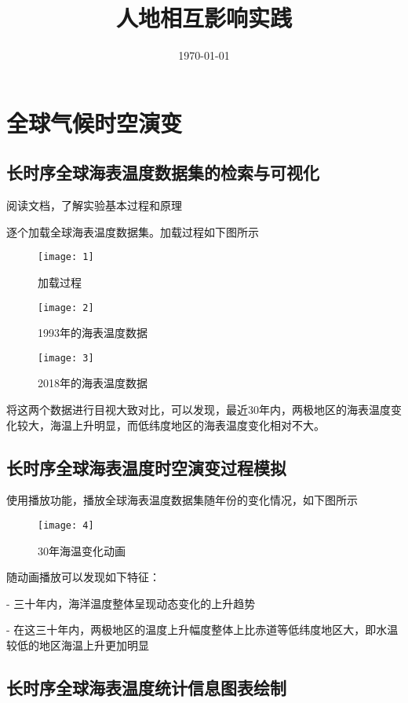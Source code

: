 \documentclass{source/Report}
\title{人地相互影响实践}
\date{\today}
\begin{document}
\makecover
\makeheader

\section{全球气候时空演变}

\subsection{长时序全球海表温度数据集的检索与可视化}

阅读文档，了解实验基本过程和原理

逐个加载全球海表温度数据集。加载过程如下图所示

\begin{figure}[H]
    \centering
    \texttt{[image: 1]}
    \caption{加载过程}
\end{figure}

\begin{figure}[H]
    \centering
    \texttt{[image: 2]}
    \caption{1993年的海表温度数据}
\end{figure}

\begin{figure}[H]
    \centering
    \texttt{[image: 3]}
    \caption{2018年的海表温度数据}
\end{figure}

将这两个数据进行目视大致对比，可以发现，最近30年内，两极地区的海表温度变化较大，海温上升明显，而低纬度地区的海表温度变化相对不大。

\subsection{长时序全球海表温度时空演变过程模拟}

使用播放功能，播放全球海表温度数据集随年份的变化情况，如下图所示

\begin{figure}[H]
    \centering
    \texttt{[image: 4]}
    \caption{30年海温变化动画}
\end{figure}

随动画播放可以发现如下特征：

- 三十年内，海洋温度整体呈现动态变化的上升趋势

- 在这三十年内，两极地区的温度上升幅度整体上比赤道等低纬度地区大，即水温较低的地区海温上升更加明显

\subsection{长时序全球海表温度统计信息图表绘制}
\end{document}
